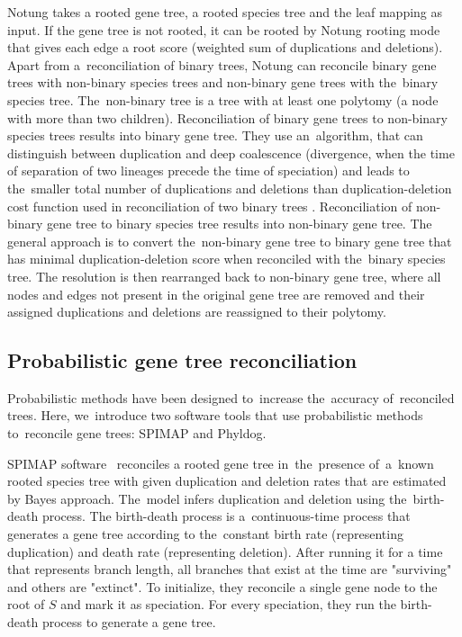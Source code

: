 Notung takes a rooted gene tree, a rooted species tree and the leaf mapping as input. If the gene tree is not rooted, it can be rooted by Notung rooting mode that gives each edge a root score (weighted sum of duplications and deletions). Apart from a~reconciliation of binary trees, Notung can reconcile binary gene trees with non-binary species trees and non-binary gene trees with the~binary species tree. The~non-binary tree is a tree with at least one polytomy (a node with more than two children).
Reconciliation of binary gene trees to non-binary species trees results into binary gene tree. They use an~algorithm, that can distinguish between duplication and deep coalescence (divergence, when the time of separation of two lineages precede the time of speciation) and leads to the~smaller total number of duplications and deletions than duplication-deletion cost function used in reconciliation of two binary trees \cite{vernot}.
Reconciliation of non-binary gene tree to binary species tree results into non-binary gene tree. The general approach is to convert the~non-binary gene tree to binary gene tree that has minimal duplication-deletion score when reconciled with the~binary species tree. The resolution is then rearranged back to non-binary gene tree, where all nodes and edges not present in the original gene tree are removed and their assigned duplications and deletions are reassigned to their polytomy.

\subsection{Probabilistic gene tree reconciliation}
Probabilistic methods have been designed to~increase the~accuracy of~reconciled trees. Here, we~introduce two software tools that use probabilistic methods to~reconcile gene trees: SPIMAP and Phyldog.

SPIMAP software~\cite{spimap} reconciles a rooted gene tree in~the~presence of~a~known rooted species tree with given duplication and deletion rates that are estimated by Bayes approach. The~model infers duplication and deletion using the~birth-death process. The birth-death process is a~continuous-time process that generates a gene tree according to the~constant birth rate (representing duplication) and death rate (representing deletion). After running it for a time that represents branch length, all branches that exist at the time are "surviving" and others are "extinct". To initialize, they reconcile a single gene node to the root of $S$ and mark it as speciation. For every speciation, they run the birth-death process to generate a gene tree.

